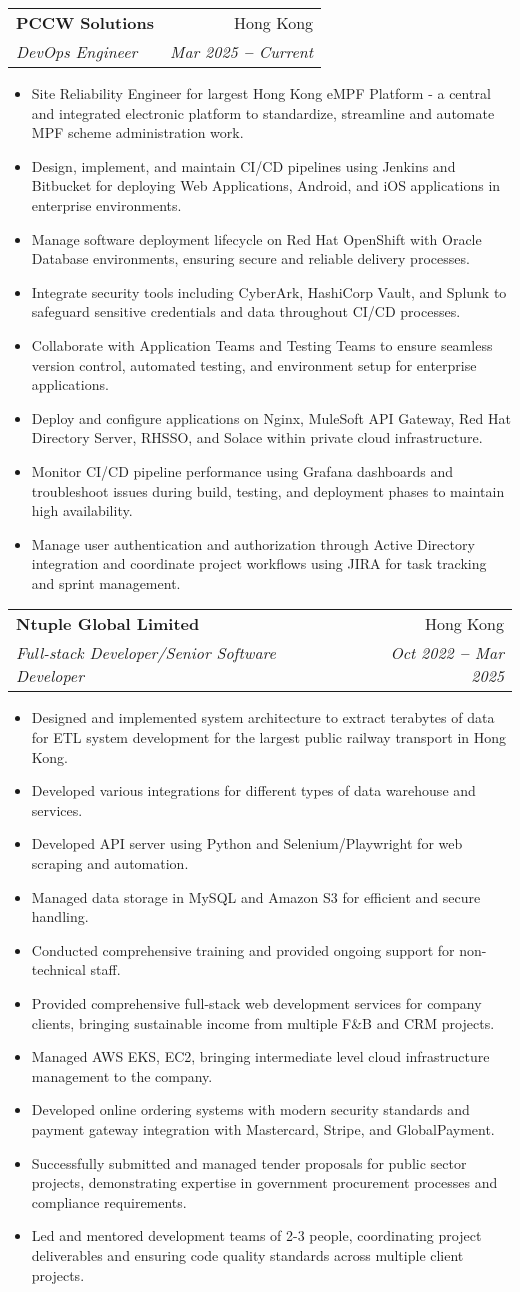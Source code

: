 \documentclass[letterpaper,11pt]{article}
\makeatletter
\newcommand{\resumeItem}[1]{
  \item\small{
    {#1 \vspace{-2pt}}
  }
}
\newcommand{\resumeSubheading}[4]{
  \vspace{-2pt}\item
    \begin{tabular*}{0.97\textwidth}[t]{l@{\extracolsep{\fill}}r}
      \textbf{#1} & #2 \\
      \textit{\small#3} & \textit{\small #4} \\
    \end{tabular*}\vspace{-7pt}
}
\newcommand{\resumeItemListStart}{\begin{itemize}}
\newcommand{\resumeItemListEnd}{\end{itemize}\vspace{-5pt}}
\makeatother
\begin{document}
    \resumeSubheading
      {PCCW Solutions}{Hong Kong}
      {DevOps Engineer}{Mar 2025 \textbf{--} Current}
        \resumeItemListStart
            \resumeItem{Site Reliability Engineer for largest Hong Kong eMPF Platform - a central and integrated electronic platform to standardize, streamline and automate MPF scheme administration work.}
            \resumeItem{Design, implement, and maintain CI/CD pipelines using Jenkins and Bitbucket for deploying Web Applications, Android, and iOS applications in enterprise environments.}
            \resumeItem{Manage software deployment lifecycle on Red Hat OpenShift with Oracle Database environments, ensuring secure and reliable delivery processes.}
            \resumeItem{Integrate security tools including CyberArk, HashiCorp Vault, and Splunk to safeguard sensitive credentials and data throughout CI/CD processes.}
            \resumeItem{Collaborate with Application Teams and Testing Teams to ensure seamless version control, automated testing, and environment setup for enterprise applications.}
            \resumeItem{Deploy and configure applications on Nginx, MuleSoft API Gateway, Red Hat Directory Server, RHSSO, and Solace within private cloud infrastructure.}
            \resumeItem{Monitor CI/CD pipeline performance using Grafana dashboards and troubleshoot issues during build, testing, and deployment phases to maintain high availability.}
            \resumeItem{Manage user authentication and authorization through Active Directory integration and coordinate project workflows using JIRA for task tracking and sprint management.}
        \resumeItemListEnd

    \resumeSubheading
      {Ntuple Global Limited}{Hong Kong}
      {Full-stack Developer/Senior Software Developer}{Oct 2022 \textbf{--} Mar 2025}
        \resumeItemListStart
            \resumeItem{Designed and implemented system architecture to extract terabytes of data for ETL system development for the largest public railway transport in Hong Kong.}
            \resumeItem{Developed various integrations for different types of data warehouse and services.}
            \resumeItem{Developed API server using Python and Selenium/Playwright for web scraping and automation.}
            \resumeItem{Managed data storage in MySQL and Amazon S3 for efficient and secure handling.}
            \resumeItem{Conducted comprehensive training and provided ongoing support for non-technical staff.}
            \resumeItem{Provided comprehensive full-stack web development services for company clients, bringing sustainable income from multiple F\&B and CRM projects.}
            \resumeItem{Managed AWS EKS, EC2, bringing intermediate level cloud infrastructure management to the company.}
            \resumeItem{Developed online ordering systems with modern security standards and payment gateway integration with Mastercard, Stripe, and GlobalPayment.}
            \resumeItem{Successfully submitted and managed tender proposals for public sector projects, demonstrating expertise in government procurement processes and compliance requirements.}
            \resumeItem{Led and mentored development teams of 2-3 people, coordinating project deliverables and ensuring code quality standards across multiple client projects.}
        \resumeItemListEnd
\end{document}
